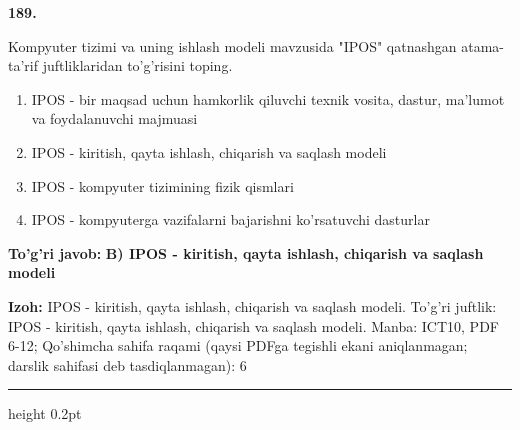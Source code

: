 \documentclass[10pt,a4paper]{article}
\begin{document}
{\bfseries\sffamily\color{ink} 189.}
\par
Kompyuter tizimi va uning ishlash modeli mavzusida "IPOS" qatnashgan atama-ta'rif juftliklaridan to'g'risini toping.
\begin{enumerate}[label=\Alph*),leftmargin=9mm]
\item IPOS - bir maqsad uchun hamkorlik qiluvchi texnik vosita, dastur, ma'lumot va foydalanuvchi majmuasi
\item IPOS - kiritish, qayta ishlash, chiqarish va saqlash modeli
\item IPOS - kompyuter tizimining fizik qismlari
\item IPOS - kompyuterga vazifalarni bajarishni ko'rsatuvchi dasturlar
\end{enumerate}
\begin{tcolorbox}[enhanced,breakable,colback=teal!4,colframe=teal!60!black,boxrule=0.45pt,arc=1.2mm,left=2.7mm,right=2.7mm,top=1.8mm,bottom=1.8mm,before skip=2mm,after skip=2mm]
{\bfseries\sffamily\color{teal}To'g'ri javob:} \textbf{B) IPOS - kiritish, qayta ishlash, chiqarish va saqlash modeli}
\par\smallskip
{\bfseries Izoh:} IPOS - kiritish, qayta ishlash, chiqarish va saqlash modeli. To'g'ri juftlik: IPOS - kiritish, qayta ishlash, chiqarish va saqlash modeli. Manba: ICT10, PDF 6-12; Qo'shimcha sahifa raqami (qaysi PDFga tegishli ekani aniqlanmagan; darslik sahifasi deb tasdiqlanmagan): 6
\end{tcolorbox}
\vspace{2mm}\hrule height 0.2pt\vspace{3mm}
\end{document}
